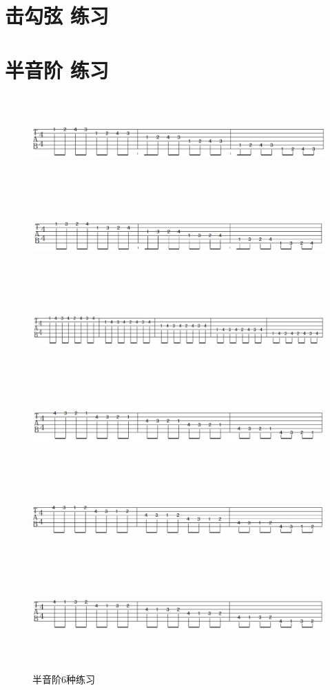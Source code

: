 \documentclass[UTF8,a4paper,12pt]{ctexbook}
\begin{document}
	\section{击勾弦 练习}
	
	
	
	\section{半音阶 练习}
		\begin{figure}[H]
			\centering
			\includegraphics[width=17cm,height=3.5cm]{banyinjie}
			\includegraphics[width=17cm,height=3.5cm]{banyinjie1}
			\includegraphics[width=17cm,height=3.5cm]{banyinjie2}
			\includegraphics[width=17cm,height=3.5cm]{banyinjie3}
			\includegraphics[width=17cm,height=3.5cm]{banyinjie4}
			\includegraphics[width=17cm,height=3.5cm]{banyinjie5}
			\caption{半音阶6种练习}
		\end{figure}
	
\end{document}
